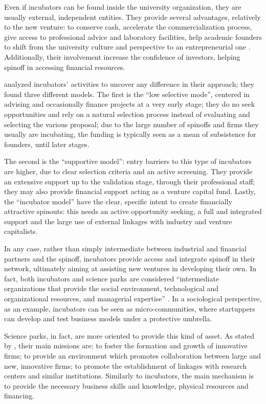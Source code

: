 Even if incubators can be found inside the university organization, they are usually external, independent entities. They provide several advantages, relatively to the new venture: to conserve cash, accelerate the commercialization process, give access to professional advice and laboratory facilities, help academic founders to shift from the university culture and perspective to an entrepreneurial one \citep{Ittelson2002}. Additionally, their involvement increase the confidence of investors, helping spinoff in accessing financial resources.

\citet{Clarysse2005} analyzed incubators' activities to uncover any difference in their approach; they found three different models. The first is the \enquote{low selective mode}, centered in advising and occasionally finance projects at a very early stage; they do no seek opportunities and rely on a natural selection process instead of evaluating and selecting the various proposal; due to the large number of spinoffs and firms they usually are incubating, the funding is typically seen as a mean of subsistence for founders, until later stages. 

The second is the \enquote{supportive model}: entry barriers to this type of incubators are higher, due to clear selection criteria and an active screening. They provide an extensive support up to the validation stage, through their professional staff; they may also provide financial support acting as a venture capital fund. Lastly, the \enquote{incubator model} have the clear, specific intent to create financially attractive spinouts: this needs an active opportunity seeking, a full and integrated support and the large use of external linkages with industry and venture capitalists.

In any case, rather than simply intermediate between industrial and financial partners and the spinoff, incubators provide access and integrate spinoff in their network, ultimately aiming at assisting new ventures in developing their own. In fact, both incubators and science parks are considered \enquote{intermediate organizations that provide the social environment, technological and organizational resources, and managerial expertise} \citep{Phan2005}. In a sociological perspective, as an example, incubators can be seen as micro-communities, where startuppers can develop and test business models under a protective umbrella. 

Science parks, in fact, are more oriented to provide this kind of asset. As stated by \citet{Siegel2003}, their main missions are: to foster the formation and growth of innovative firms; to provide an environment which promotes collaboration between large and new, innovative firms; to promote the establishment of linkages with research centers and similar institutions. Similarly to incubators, the main mechanism is to provide the necessary business skills and knowledge, physical resources and financing.

